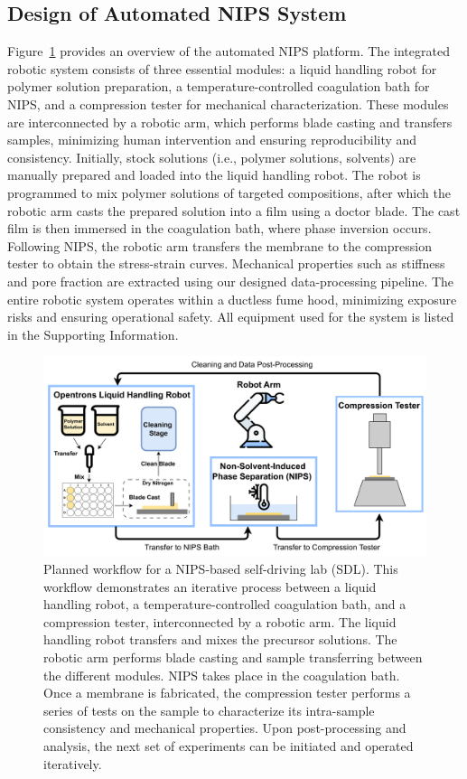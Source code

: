 \documentclass[preprint,12pt,times]{elsarticle}
\begin{document}
\subsection{Design of Automated NIPS System}
\label{Design of Automated NIPS System}
Figure~\ref{HTE_workflow.png} provides an overview of the automated NIPS platform. The integrated robotic system consists of three essential modules: a liquid handling robot for polymer solution preparation, a temperature-controlled coagulation bath for NIPS, and a compression tester for mechanical characterization. These modules are interconnected by a robotic arm, which performs blade casting and transfers samples, minimizing human intervention and ensuring reproducibility and consistency. Initially, stock solutions (i.e., polymer solutions, solvents) are manually prepared and loaded into the liquid handling robot. The robot is programmed to mix polymer solutions of targeted compositions, after which the robotic arm casts the prepared solution into a film using a doctor blade. The cast film is then immersed in the coagulation bath, where phase inversion occurs. Following NIPS, the robotic arm transfers the membrane to the compression tester to obtain the stress-strain curves. Mechanical properties such as stiffness and pore fraction are extracted using our designed data-processing pipeline. The entire robotic system operates within a ductless fume hood, minimizing exposure risks and ensuring operational safety. All equipment used for the system is listed in the Supporting Information.

\begin{figure}[ht]
\centering
\includegraphics[width=\linewidth]{HTE_workflow.png}
\caption{Planned workflow for a NIPS-based self-driving lab (SDL). This workflow demonstrates an iterative process between a liquid handling robot, a temperature-controlled coagulation bath, and a compression tester, interconnected by a robotic arm. The liquid handling robot transfers and mixes the precursor solutions. The robotic arm performs blade casting and sample transferring between the different modules. NIPS takes place in the coagulation bath. Once a membrane is fabricated, the compression tester performs a series of tests on the sample to characterize its intra-sample consistency and mechanical properties. Upon post-processing and analysis, the next set of experiments can be initiated and operated iteratively.}
\label{HTE_workflow.png}
\end{figure}
\end{document}
